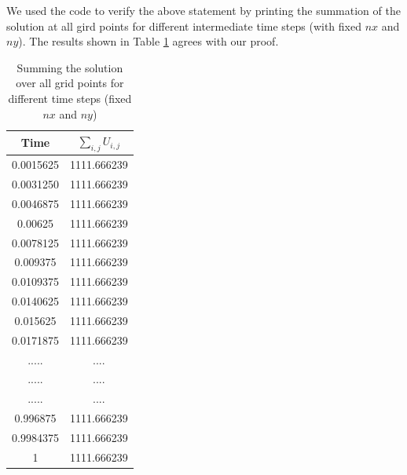 We used the code to verify the above statement by printing the summation of the solution at all gird points for different intermediate time steps (with fixed $nx$ and $ny$). The results shown in Table \ref{tab:sum} agrees with our proof. 

\begin{table}[h!]
\centering
\begin{tabular}{|c|c|}
\hline
Time & $\sum_{i,j}U_{i,j}$  \\ 
\hline
0.0015625 & 1111.666239  \\ 
0.0031250 & 1111.666239  \\  
0.0046875 & 1111.666239  \\
0.00625 & 1111.666239  \\
0.0078125 & 1111.666239  \\
0.009375& 1111.666239  \\
0.0109375 & 1111.666239  \\
 0.0140625 & 1111.666239  \\
 0.015625 & 1111.666239  \\
0.0171875 & 1111.666239  \\
..... & ....  \\
..... & ....  \\
..... & ....  \\
0.996875 & 1111.666239  \\
0.9984375 & 1111.666239  \\
 1 & 1111.666239  \\
\end{tabular}
\caption{Summing the solution over all grid points for different time steps (fixed $nx$ and $ny$)}
\label{tab:sum}
\end{table}